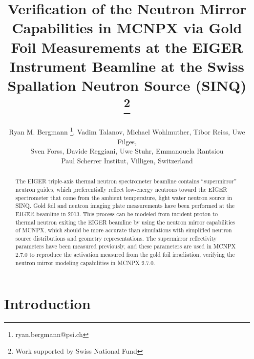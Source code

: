 \documentclass[a4paper,
              ]{jacow}
\begin{document}
\title{Verification of the Neutron Mirror Capabilities in MCNPX via Gold Foil Measurements at the EIGER Instrument Beamline at the Swiss Spallation Neutron Source (SINQ) \thanks{Work supported by Swiss National Fund}}

\author{Ryan M. Bergmann \thanks{ryan.bergmann@psi.ch}, Vadim Talanov, Michael Wohlmuther, Tibor Reiss, Uwe Filges, \\ Sven Forss, Davide Reggiani, Uwe Stuhr, Emmanouela Rantsiou\\ Paul Scherrer Institut, Villigen, Switzerland\\}

\maketitle

%
\begin{abstract}
   The EIGER triple-axis thermal neutron spectrometer beamline contains “supermirror” neutron guides, which preferentially reflect low-energy neutrons toward the EIGER spectrometer that come from the ambient temperature, light water neutron source in SINQ.  Gold foil and neutron imaging plate measurements have been performed at the EIGER beamline in 2013.  This process can be modeled from incident proton to thermal neutron exiting the EIGER beamline by using the neutron mirror capabilities of MCNPX, which should be more accurate than simulations with simplified neutron source distributions and geometry representations.  The supermirror reflectivity parameters have been measured previously, and these parameters are used in MCNPX 2.7.0 to reproduce the activation measured from the gold foil irradiation, verifying the neutron mirror modeling capabilities in MCNPX 2.7.0.
\end{abstract}


\section{Introduction}
\end{document}

